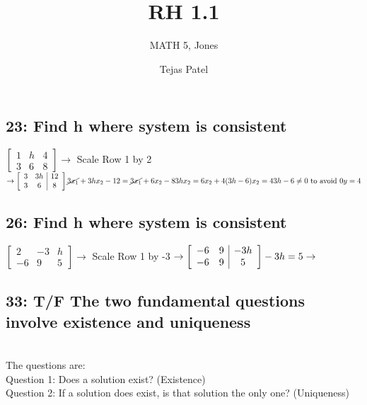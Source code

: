 \documentclass{article}
\title{RH 1.1}
\author{MATH 5, Jones}
\date{Tejas Patel}
\begin{document}
\maketitle




\subsection*{23: Find h where system is consistent}
$\left[\begin{array}{cc|c}
1 & h & 4 \\
3 & 6 & 8
\end{array}\right] 
\rightarrow$ Scale Row 1 by 2 $\rightarrow
\left[\begin{array}{cc|c}
3 & 3h & 12 \\
3 & 6 & 8
\end{array}\right] \\[0.05in]
\cancel{3x_1}+3hx_2-12=\cancel{3x_1}+6x_2-8\\ 
3hx_2=6x_2+4 \\ (3h-6)x_2=4 \\ 3h-6 \neq 0\text{ to avoid } 0y=4$ \\ 

\subsection*{26: Find h where system is consistent}
$ \left[\begin{array}{cc|c}
2 & -3 & h \\
-6 & 9 & 5
\end{array}\right] 
\rightarrow$ Scale Row 1 by -3
$\rightarrow \left[\begin{array}{cc|c}
-6 & 9 & -3h \\
-6 & 9 & 5
\end{array}\right] \\[0.05in] 
-3h=5 \rightarrow$ 

\subsection*{33: T/F The two fundamental questions involve existence and uniqueness}
\\The questions are:\\
Question 1: Does a solution exist? (Existence)\\Question 2: If a solution does exist, is that solution the only one? (Uniqueness)\\
\end{document}
